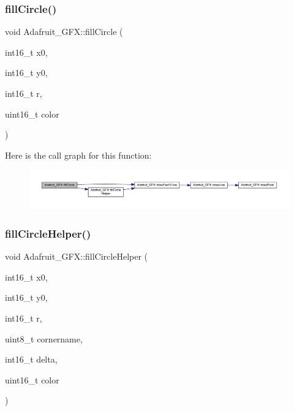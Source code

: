 \subsubsection{\texorpdfstring{fill\+Circle()}{fillCircle()}}
{\footnotesize\ttfamily void Adafruit\+\_\+\+G\+F\+X\+::fill\+Circle (\begin{DoxyParamCaption}\item[{int16\+\_\+t}]{x0,  }\item[{int16\+\_\+t}]{y0,  }\item[{int16\+\_\+t}]{r,  }\item[{uint16\+\_\+t}]{color }\end{DoxyParamCaption})}

Here is the call graph for this function\+:\nopagebreak
\begin{figure}[H]
\begin{center}
\leavevmode
\includegraphics[width=350pt]{class_adafruit___g_f_x_a623e031e58492fb41e9fde6a05d97c12_cgraph}
\end{center}
\end{figure}
\mbox{\label{class_adafruit___g_f_x_a2242d3560b08c6480084152b6660052a}} 
\subsubsection{\texorpdfstring{fill\+Circle\+Helper()}{fillCircleHelper()}}
{\footnotesize\ttfamily void Adafruit\+\_\+\+G\+F\+X\+::fill\+Circle\+Helper (\begin{DoxyParamCaption}\item[{int16\+\_\+t}]{x0,  }\item[{int16\+\_\+t}]{y0,  }\item[{int16\+\_\+t}]{r,  }\item[{uint8\+\_\+t}]{cornername,  }\item[{int16\+\_\+t}]{delta,  }\item[{uint16\+\_\+t}]{color }\end{DoxyParamCaption})}

